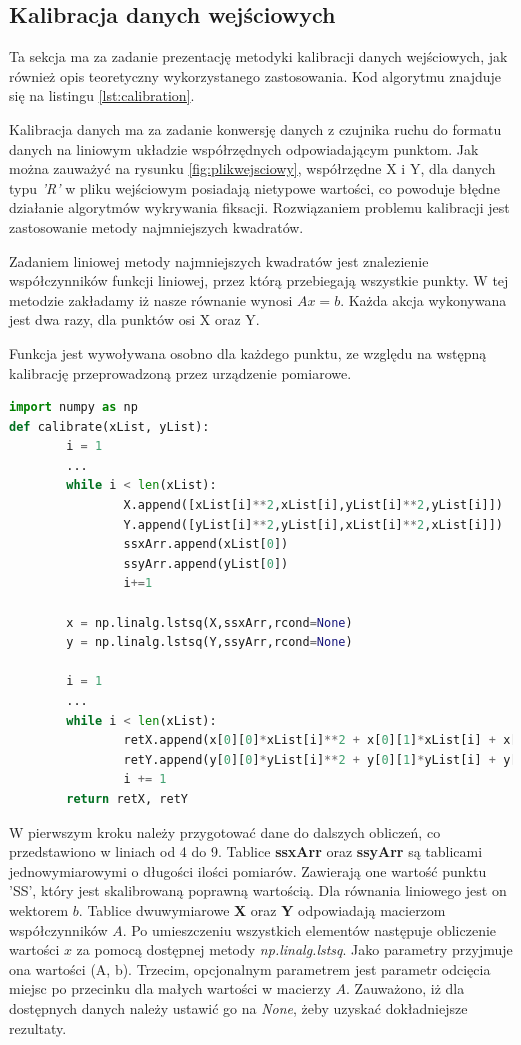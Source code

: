 \subsection{Kalibracja danych wejściowych}
\label{ssec:calibrationtheory}
Ta sekcja ma za zadanie prezentację metodyki kalibracji danych wejściowych, jak również opis teoretyczny wykorzystanego zastosowania. Kod algorytmu znajduje się na listingu \ref{lst:calibration}.\par
Kalibracja danych ma za zadanie konwersję danych z czujnika ruchu do formatu danych na liniowym układzie współrzędnych odpowiadającym punktom. Jak można zauważyć na rysunku \ref{fig:plikwejsciowy}, współrzędne X i Y, dla danych typu \emph{'R'} w pliku wejściowym posiadają nietypowe wartości, co powoduje błędne działanie algorytmów wykrywania fiksacji. Rozwiązaniem problemu kalibracji jest zastosowanie metody najmniejszych kwadratów.\par
Zadaniem liniowej metody najmniejszych kwadratów jest znalezienie współczynników funkcji liniowej, przez którą przebiegają wszystkie punkty. W tej metodzie zakładamy iż nasze równanie wynosi $Ax = b$. Każda akcja wykonywana jest dwa razy, dla punktów osi X oraz Y.\par
Funkcja jest wywoływana osobno dla każdego punktu, ze względu na wstępną kalibrację przeprowadzoną przez urządzenie pomiarowe.
\begin{lstlisting}[language=Python, caption=Algorytm kalibracji, label={lst:calibration}]
import numpy as np
def calibrate(xList, yList):
        i = 1
        ...
        while i < len(xList):
                X.append([xList[i]**2,xList[i],yList[i]**2,yList[i]])
                Y.append([yList[i]**2,yList[i],xList[i]**2,xList[i]])
                ssxArr.append(xList[0])
                ssyArr.append(yList[0])
                i+=1
        
        x = np.linalg.lstsq(X,ssxArr,rcond=None)
        y = np.linalg.lstsq(Y,ssyArr,rcond=None)

        i = 1
        ...
        while i < len(xList):
                retX.append(x[0][0]*xList[i]**2 + x[0][1]*xList[i] + x[0][2]*yList[i]**2 + x[0][3]*yList[i])
                retY.append(y[0][0]*yList[i]**2 + y[0][1]*yList[i] + y[0][2]*xList[i]**2 + y[0][3]*xList[i])
                i += 1
        return retX, retY
\end{lstlisting}
W pierwszym kroku należy przygotować dane do dalszych obliczeń, co przedstawiono w liniach od 4 do 9. Tablice \textbf{ssxArr} oraz \textbf{ssyArr} są tablicami jednowymiarowymi o długości ilości pomiarów. Zawierają one wartość punktu 'SS', który jest skalibrowaną poprawną wartością. Dla równania liniowego jest on wektorem $b$. Tablice dwuwymiarowe \textbf{X} oraz \textbf{Y} odpowiadają macierzom współczynników $A$. Po umieszczeniu wszystkich elementów następuje obliczenie wartości $x$ za pomocą dostępnej metody \emph{np.linalg.lstsq}. Jako parametry przyjmuje ona wartości (A, b). Trzecim, opcjonalnym parametrem jest parametr odcięcia miejsc po przecinku dla małych wartości w macierzy $A$. Zauważono, iż dla dostępnych danych należy ustawić go na \emph{None}, żeby uzyskać dokładniejsze rezultaty.\par
